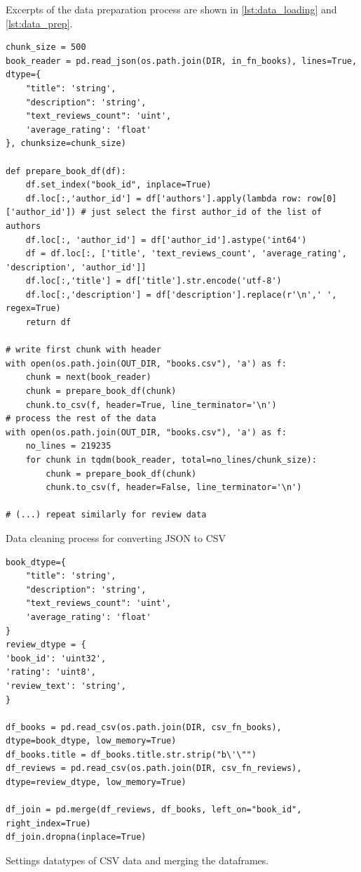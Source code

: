 \documentclass[10pt,final,journal,a4paper,oneside,twocolumn]{IEEEtran}
\begin{document}
Excerpts of the data preparation process are shown in \autoref{lst:data_loading} and \autoref{lst:data_prep}.

\begin{listing}[h]
    \begin{verbatim}
chunk_size = 500
book_reader = pd.read_json(os.path.join(DIR, in_fn_books), lines=True, dtype={
    "title": 'string', 
    "description": 'string', 
    "text_reviews_count": 'uint', 
    'average_rating': 'float'
}, chunksize=chunk_size)

def prepare_book_df(df):
    df.set_index("book_id", inplace=True)
    df.loc[:,'author_id'] = df['authors'].apply(lambda row: row[0]['author_id']) # just select the first author_id of the list of authors
    df.loc[:, 'author_id'] = df['author_id'].astype('int64')
    df = df.loc[:, ['title', 'text_reviews_count', 'average_rating', 'description', 'author_id']]
    df.loc[:,'title'] = df['title'].str.encode('utf-8')
    df.loc[:,'description'] = df['description'].replace(r'\n',' ', regex=True) 
    return df

# write first chunk with header
with open(os.path.join(OUT_DIR, "books.csv"), 'a') as f:
    chunk = next(book_reader)
    chunk = prepare_book_df(chunk)
    chunk.to_csv(f, header=True, line_terminator='\n')  
# process the rest of the data
with open(os.path.join(OUT_DIR, "books.csv"), 'a') as f:
    no_lines = 219235
    for chunk in tqdm(book_reader, total=no_lines/chunk_size):
        chunk = prepare_book_df(chunk)
        chunk.to_csv(f, header=False, line_terminator='\n')

# (...) repeat similarly for review data
    \end{verbatim}
\caption{\small Data cleaning process for converting JSON to CSV}
\label{lst:data_loading}
\end{listing}
\begin{listing}[h]
    \begin{verbatim}
book_dtype={
    "title": 'string', 
    "description": 'string', 
    "text_reviews_count": 'uint', 
    'average_rating': 'float'
}
review_dtype = {
'book_id': 'uint32',
'rating': 'uint8',
'review_text': 'string',
}

df_books = pd.read_csv(os.path.join(DIR, csv_fn_books), dtype=book_dtype, low_memory=True)
df_books.title = df_books.title.str.strip("b\'\"") 
df_reviews = pd.read_csv(os.path.join(DIR, csv_fn_reviews), dtype=review_dtype, low_memory=True)

df_join = pd.merge(df_reviews, df_books, left_on="book_id", right_index=True)
df_join.dropna(inplace=True)
    \end{verbatim}
\caption{\small Settings datatypes of CSV data and merging the dataframes.}
\label{lst:data_prep}
\end{listing}
\end{document}
